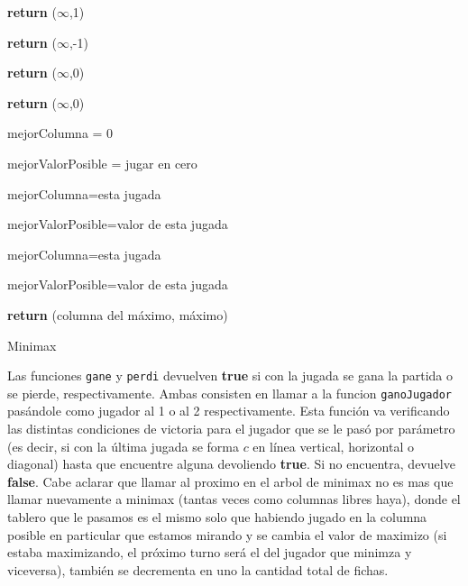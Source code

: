 \documentclass[A4paper,oneside,fleqn,11pt]{article}
\theoremstyle{definition}
\begin{document}
\begin{algorithm}


    
			{
			\textbf{return} ($\infty$,1)
			}

			{
			\textbf{return} ($\infty$,-1)
			}

			{
			\textbf{return} ($\infty$,0)
			}

			{
		    \textbf{return} ($\infty$,0)
		    }
		
		mejorColumna = 0

		mejorValorPosible = jugar en cero

			{
					{
		  	  			{
						mejorColumna=esta jugada

						mejorValorPosible=valor de esta jugada
						}
					}
					{
		  	  			{
						mejorColumna=esta jugada

						mejorValorPosible=valor de esta jugada
						}
					}
			}
		\textbf{return} (columna del máximo, máximo)
		

\caption{Minimax}
\end{algorithm}

Las funciones \texttt{gane} y \texttt{perdi} devuelven \textbf{true} si con la jugada se gana la partida o se pierde, respectivamente. Ambas consisten en llamar a la funcion \texttt{ganoJugador} pasándole como jugador al 1 o al 2 respectivamente. Esta función va verificando las distintas condiciones de victoria para el jugador que se le pasó por parámetro (es decir, si con la última jugada se forma $c$ en línea vertical, horizontal o diagonal) hasta que encuentre alguna devoliendo \textbf{true}. Si no encuentra, devuelve \textbf{false}. Cabe aclarar que llamar al proximo en el arbol de minimax no es mas que llamar nuevamente a minimax (tantas veces como columnas libres haya), donde el tablero que le pasamos es el mismo solo que habiendo jugado en la columna posible en particular que estamos mirando y se cambia el valor de maximizo (si estaba maximizando, el próximo turno será el del jugador que minimza y viceversa), también se decrementa en uno la cantidad total de fichas.
\end{document}
